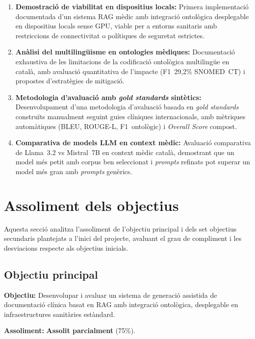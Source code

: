 \documentclass[CAT]{TFUOC}%
\begin{document}
\begin{enumerate}
    \item \textbf{Demostració de viabilitat en dispositius locals:} Primera implementació documentada d'un sistema RAG mèdic amb integració ontològica desplegable en dispositius locals sense GPU, viable per a entorns sanitaris amb restriccions de connectivitat o polítiques de seguretat estrictes.
    
    \item \textbf{Anàlisi del multilingüisme en ontologies mèdiques:} Documentació exhaustiva de les limitacions de la codificació ontològica multilingüe en català, amb avaluació quantitativa de l'impacte (F1~29,2\% SNOMED~CT) i propostes d'estratègies de mitigació.
    
    \item \textbf{Metodologia d'avaluació amb \textit{gold standards} sintètics:} Desenvolupament d'una metodologia d'avaluació basada en \textit{gold standards} construïts manualment seguint guies clíniques internacionals, amb mètriques automàtiques (BLEU, ROUGE-L, F1~ontològic) i \textit{Overall Score} compost.
    
    \item \textbf{Comparativa de models LLM en context mèdic:} Avaluació comparativa de Llama~3.2 vs Mistral~7B en context mèdic català, demostrant que un model més petit amb corpus ben seleccionat i \textit{prompts} refinats pot superar un model més gran amb \textit{prompts} genèrics.
\end{enumerate}

\section{Assoliment dels objectius}

Aquesta secció analitza l'assoliment de l'objectiu principal i dels set objectius secundaris plantejats a l'inici del projecte, avaluant el grau de compliment i les desviacions respecte als objectius inicials.

\subsection{Objectiu principal}

\textbf{Objectiu:} Desenvolupar i avaluar un sistema de generació assistida de documentació clínica basat en RAG amb integració ontològica, desplegable en infraestructures sanitàries estàndard.

\textbf{Assoliment:} \textbf{Assolit parcialment} (75\%).
\end{document}
